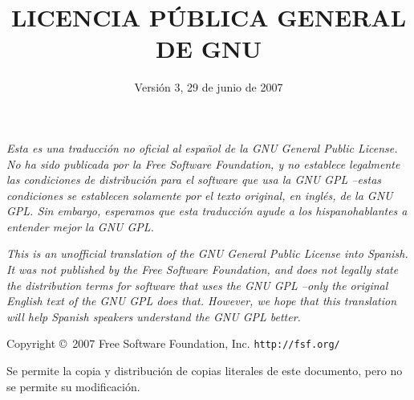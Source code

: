 \documentclass[11pt]{article}
\title{LICENCIA P\'{U}BLICA GENERAL DE GNU}
\date{Versi\'{o}n 3, 29 de junio de 2007}
\begin{document}
\maketitle
{}
\textit{Esta es una traducci\'{o}n no oficial al espa\~nol de la GNU General Public License. No ha sido publicada por la Free Software Foundation, y no establece legalmente las condiciones de distribuci\'{o}n para el software que usa la GNU GPL --estas condiciones se establecen solamente por el texto original, en ingl\'{e}s, de la GNU GPL. Sin embargo, esperamos que esta traducci\'{o}n ayude a los hispanohablantes a entender mejor la GNU GPL. }

\vspace{0.4cm}

\textit{This is an unofficial translation of the GNU General Public License 
into Spanish. It was not published by the Free Software Foundation, and 
does not legally state the distribution terms for software that uses the 
GNU GPL --only the original English text of the GNU GPL does that. However, 
we hope that this translation will help Spanish speakers understand the 
GNU GPL better.}

\begin{center}
{\parindent 0in Copyright \copyright\  2007 Free Software Foundation, Inc. \texttt{http://fsf.org/}
  
 
\bigskip
Se permite la copia y distribuci\'{o}n de copias literales de este documento, pero no se permite su modificaci\'{o}n. }

\end{center}
\end{document}
